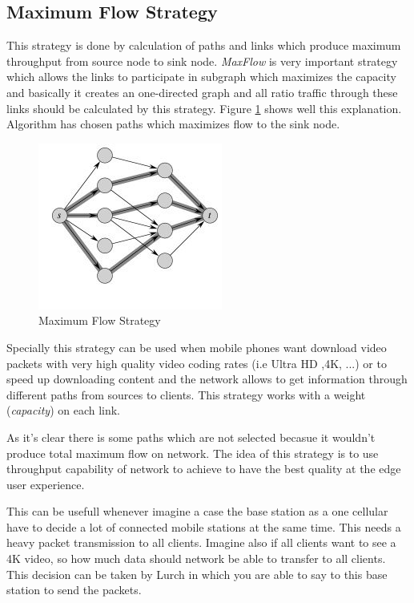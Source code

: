 \subsection{Maximum Flow Strategy}
This strategy is done by calculation of paths and links which produce maximum throughput from source node to sink node. \textit{MaxFlow} is very important strategy which allows the links to participate in subgraph which maximizes the capacity and basically it creates an one-directed graph and all ratio traffic through these links should be calculated by this strategy. Figure \ref{max} shows well this explanation. Algorithm has chosen paths which maximizes flow to the sink node.

\begin{figure}[H]

\begin{center}

\includegraphics[scale = 0.8]{Pictures/max.jpg}

\caption{Maximum Flow Strategy} \label{max} 

\end{center}

\end{figure}


 
Specially this strategy can be used when mobile phones want download video packets with very high quality video coding rates (i.e Ultra HD ,4K, ...) or to speed up downloading content and the network allows to get information through different paths from sources to clients. This strategy works with a weight (\textit{capacity}) on each link.

As it's clear there is some paths which are not selected becasue it wouldn't produce total maximum flow on network.  The idea of this strategy is to use throughput capability of network to achieve to have the best quality at the edge user experience. 

This can be usefull whenever imagine a case the base station as a one cellular have to decide a lot of connected mobile stations at the same time. This needs a heavy packet transmission to all clients. Imagine also if all clients want to see a 4K video, so how much data should network be able to transfer to all clients. This decision can be taken by Lurch in which you are able to say to this base station to send the packets.

 





